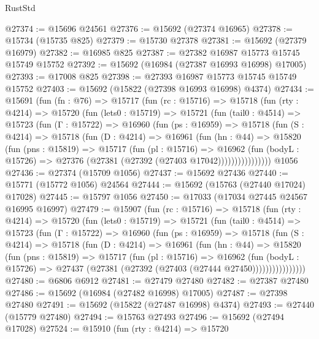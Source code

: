 \begin{lexlean}{RustStd}
\begin{coremodule}
@27374 := @15696 @24561
@27376 := @15692 (@27374 @16965)
@27378 := @15734 (@15735 @825)
@27379 := @15730 @27378
@27381 := @15692 (@27379 @16979)
@27382 := @16985 @825
@27387 := @27382 @16987 @15773 @15745 @15749 @15752
@27392 := @15692 (@16984 (@27387 @16993 @16998) @17005)
@27393 := @17008 @825
@27398 := @27393 @16987 @15773 @15745 @15749 @15752
@27403 := @15692 (@15822 (@27398 @16993 @16998) @4374)
@27434 := @15691
    (fun (fn : @76) =>
    @15717
      (fun (rc : @15716) =>
      @15718
        (fun (rty : @4214) =>
        @15720
          (fun (lets0 : @15719) =>
          @15721
            (fun (tail0 : @4514) =>
            @15723
              (fun (Γ : @15722) =>
              @16960
                (fun (ps : @16959) =>
                @15718
                  (fun (S : @4214) =>
                  @15718
                    (fun (D : @4214) =>
                    @16961
                      (fun (hn : @44) =>
                      @15820
                        (fun (pns : @15819) =>
                        @15717
                          (fun (pl : @15716) =>
                          @16962
                            (fun (bodyL : @15726) =>
                            @27376 (@27381 (@27392 (@27403 @17042))))))))))))))))
    @1056
@27436 := @27374 (@15709 @1056)
@27437 := @15692 @27436
@27440 := @15771 (@15772 @1056) @24564
@27444 := @15692 (@15763 (@27440 @17024) @17028)
@27445 := @15797 @1056
@27450 := @17033 (@17034 @27445 @24567 @16995 @16997)
@27479 := @15907
    (fun (rc : @15716) =>
    @15718
      (fun (rty : @4214) =>
      @15720
        (fun (lets0 : @15719) =>
        @15721
          (fun (tail0 : @4514) =>
          @15723
            (fun (Γ : @15722) =>
            @16960
              (fun (ps : @16959) =>
              @15718
                (fun (S : @4214) =>
                @15718
                  (fun (D : @4214) =>
                  @16961
                    (fun (hn : @44) =>
                    @15820
                      (fun (pns : @15819) =>
                      @15717
                        (fun (pl : @15716) =>
                        @16962
                          (fun (bodyL : @15726) =>
                          @27437 (@27381 (@27392 (@27403 (@27444 @27450))))))))))))))))
@27480 := @6806 @6912
@27481 := @27479 @27480
@27482 := @27387 @27480
@27486 := @15692 (@16984 (@27482 @16998) @17005)
@27487 := @27398 @27480
@27491 := @15692 (@15822 (@27487 @16998) @4374)
@27493 := @27440 (@15779 @27480)
@27494 := @15763 @27493
@27496 := @15692 (@27494 @17028)
@27524 := @15910
    (fun (rty : @4214) =>
    @15720

\end{coremodule}
\end{lexlean}

